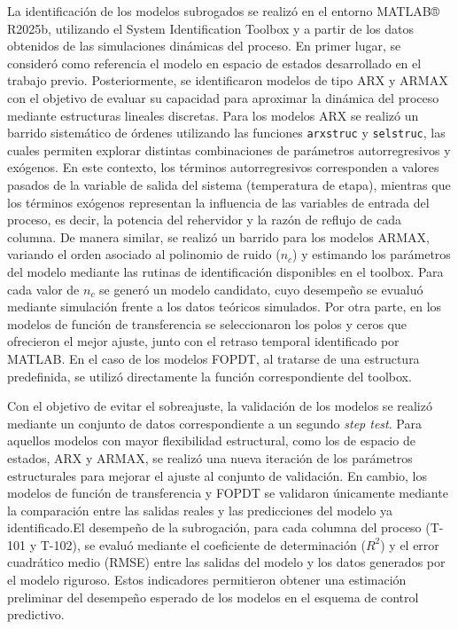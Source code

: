 La identificación de los modelos subrogados se realizó en el entorno MATLAB® R2025b, utilizando el System Identification Toolbox y a partir de los datos obtenidos de las simulaciones dinámicas del proceso. En primer lugar, se consideró como referencia el modelo en espacio de estados desarrollado en el trabajo previo. Posteriormente, se identificaron modelos de tipo ARX y ARMAX con el objetivo de evaluar su capacidad para aproximar la dinámica del proceso mediante estructuras lineales discretas. Para los modelos ARX se realizó un barrido sistemático de órdenes utilizando las funciones \texttt{arxstruc} y \texttt{selstruc}, las cuales permiten explorar distintas combinaciones de parámetros autorregresivos y exógenos. En este contexto, los términos autorregresivos corresponden a valores pasados de la variable de salida del sistema (temperatura de etapa), mientras que los términos exógenos representan la influencia de las variables de entrada del proceso, es decir, la potencia del rehervidor y la razón de reflujo de cada columna. De manera similar, se realizó un barrido para los modelos ARMAX, variando el orden asociado al polinomio de ruido ($n_c$) y estimando los parámetros del modelo mediante las rutinas de identificación disponibles en el toolbox. Para cada valor de $n_c$ se generó un modelo candidato, cuyo desempeño se evualuó mediante simulación frente a los datos teóricos simulados. Por otra parte, en los modelos de función de transferencia se seleccionaron los polos y ceros que ofrecieron el mejor ajuste, junto con el retraso temporal identificado por MATLAB. En el caso de los modelos FOPDT, al tratarse de una estructura predefinida, se utilizó directamente la función correspondiente del toolbox.

\vspace{0.2cm}

Con el objetivo de evitar el sobreajuste, la validación de los modelos se realizó mediante un conjunto de datos correspondiente a un segundo \textit{step test}. Para aquellos modelos con mayor flexibilidad estructural, como los de espacio de estados, ARX y ARMAX, se realizó una nueva iteración de los parámetros estructurales para mejorar el ajuste al conjunto de validación. En cambio, los modelos de función de transferencia y FOPDT se validaron únicamente mediante la comparación entre las salidas reales y las predicciones del modelo ya identificado.El desempeño de la subrogación, para cada columna del proceso (T-101 y T-102), se evaluó mediante el coeficiente de determinación ($R^2$) y el error cuadrático medio (RMSE) entre las salidas del modelo y los datos generados por el modelo riguroso. Estos indicadores permitieron obtener una estimación preliminar del desempeño esperado de los modelos en el esquema de control predictivo.

